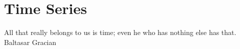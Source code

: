 \chapter{Time Series}
\label{sec:ts}


\inspire%
{All that really belongs to us is time; even he who has nothing else has that.}%
{Baltasar Gracian}

